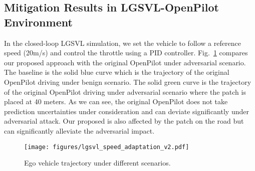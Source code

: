 \subsection{Mitigation Results in LGSVL-OpenPilot Environment}
In the closed-loop LGSVL simulation, we set the vehicle to follow a reference speed (20m/s) and control the throttle using a PID controller.  Fig.~\ref{fig:lgsvl_speed_adapt} compares our proposed approach with the original OpenPilot under adversarial scenario. The baseline is the solid blue curve which is the trajectory of the original OpenPilot driving under benign scenario. The solid green curve is the trajectory of the original OpenPilot driving under adversarial scenario where the patch is placed at 40 meters. As we can see, the original OpenPilot does not take prediction uncertainties under consideration and can deviate significantly under adversarial attack. Our proposed is also affected by the patch on the road but can significantly alleviate the adversarial impact.
\begin{figure}[!htbp]
    \centering
    \texttt{[image: figures/lgsvl\_speed\_adaptation\_v2.pdf]}
    \caption{Ego vehicle trajectory under different scenarios. %
    }
    \label{fig:lgsvl_speed_adapt}
\end{figure}

